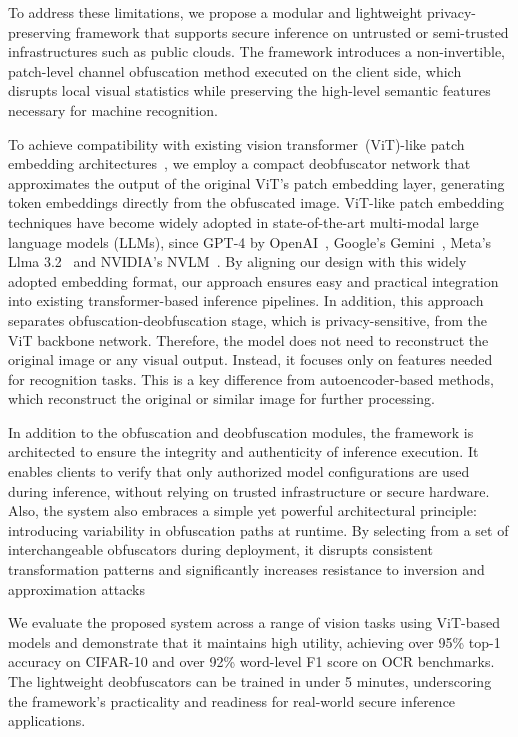 \documentclass{ieeeaccess}
\begin{document}
To address these limitations, we propose a modular and lightweight privacy-preserving framework that supports secure inference on untrusted or semi-trusted infrastructures such as public clouds. The framework introduces a non-invertible, patch-level channel obfuscation method executed on the client side, which disrupts local visual statistics while preserving the high-level semantic features necessary for machine recognition.

To achieve compatibility with existing vision transformer~(ViT)-like patch embedding architectures~\cite{dosovitskiy2020vit}, we employ a compact deobfuscator network that approximates the output of the original ViT's patch embedding layer, generating token embeddings directly from the obfuscated image. ViT-like patch embedding techniques have become widely adopted in state-of-the-art multi-modal large language models (LLMs), since GPT-4 by OpenAI~\cite{2023GPT4VisionSC}, Google's Gemini~\cite{geminiteam2025geminifamilyhighlycapable}, Meta's Llma 3.2~\cite{meta2024llama3} and NVIDIA's NVLM~\cite{dai2024nvlmopenfrontierclassmultimodal}. By aligning our design with this widely adopted embedding format, our approach ensures easy and practical integration into existing transformer-based inference pipelines. In addition, this approach separates obfuscation-deobfuscation stage, which is privacy-sensitive, from the ViT backbone network. Therefore, the model does not need to reconstruct the original image or any visual output. Instead, it focuses only on features needed for recognition tasks. This is a key difference from autoencoder-based methods, which reconstruct the original or similar image for further processing.

In addition to the obfuscation and deobfuscation modules, the framework is architected to ensure the integrity and authenticity of inference execution. It enables clients to verify that only authorized model configurations are used during inference, without relying on trusted infrastructure or secure hardware. Also, the system also embraces a simple yet powerful architectural principle: introducing variability in obfuscation paths at runtime. By selecting from a set of interchangeable obfuscators during deployment, it disrupts consistent transformation patterns and significantly increases resistance to inversion and approximation attacks

We evaluate the proposed system across a range of vision tasks using ViT-based models and demonstrate that it maintains high utility, achieving over 95\% top-1 accuracy on CIFAR-10 and over 92\% word-level F1 score on OCR benchmarks. The lightweight deobfuscators can be trained in under 5 minutes, underscoring the framework’s practicality and readiness for real-world secure inference applications.
\end{document}
